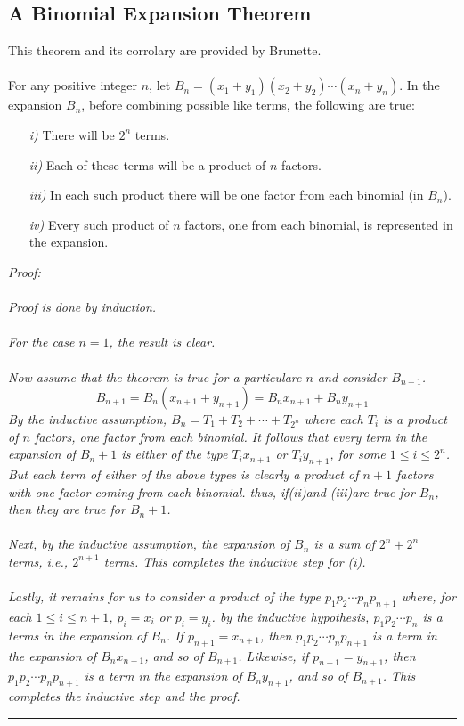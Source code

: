 \subsection{A Binomial Expansion Theorem}
\label{BinomialTheor2.1}
This theorem and its corrolary are provided by Brunette\cite{Bruneta}.\\
\\
For any positive integer $n$, let $B_n = (x_1+y_1) (x_2+y_2) \cdots (x_n+y_n)$.  In the expansion $B_n$, before combining possible like terms, the following are true:
\begin{itemize}
\item[\it i)] There will be $2^n$ terms.
\item[\it ii)] Each of these terms will be a product of $n$ factors.
\item[\it iii)]  In each such product there will be one factor from each binomial (in $B_n$).
\item[\it iv)] Every such product of $n$ factors, one from each binomial, is represented in the expansion.
\end{itemize}
\it Proof: \rm\\
\\
Proof is done by induction.\\
\\
For the case $n=1$, the result is clear.\\
\\
Now assume that the theorem is true for a particulare $n$ and consider $B_{n+1}$.
\[ B_{n+1} = B_n(x_{n+1} + y_{n+1}) = B_nx_{n+1} + B_ny_{n+1} \]
By the inductive assumption, $B_n = T_1 + T_2 + \cdots + T_{2^n}$ where each $T_i$ is a product of $n$ factors, one factor from each binomial.  It follows that every term in the expansion of $B_n+1$ is either of the type $T_ix_{n+1}$ or $T_iy_{n+1}$, for some $1\leq i \leq 2^n$.  But each term of either of the above types is clearly a product of $n+1$ factors with one factor coming from each binomial.  thus, if\it (ii)\rm and \it (iii)\rm are true for $B_n$, then they are true for $B_n+1$.\\
\\
Next, by the inductive assumption, the expansion of $B_n$ is a sum of $2^n+2^n$ terms, i.e., $2^{n+1}$ terms.  This completes the inductive step for \it(i)\rm.\\
\\
Lastly, it remains for us to consider a product of the type $p_1 p_2 \cdots p_n p_{n+1}$ where, for each $1\leq i\leq n+1$, $p_i = x_i$ or $p_i = y_i$.  by the inductive hypothesis, $p_1 p_2 \cdots p_n$ is a terms in the expansion of $B_n$.  If $p_{n+1} = x_{n+1}$, then $p_1 p_2 \cdots p_n p_{n+1}$ is a term in the expansion of $B_nx_{n+1}$, and so of $B_{n+1}$.  Likewise, if $p_{n+1}=y_{n+1}$, then $p_1 p_2 \cdots p_n p_{n+1}$ is a term in the expansion of $B_n y_{n+1}$, and so of $B_{n+1}$.  This completes the inductive step and the proof.\rule{.05in}{.05in}\\



